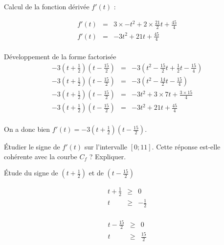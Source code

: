 \begin{questions}
		\begin{solution}
			Calcul de la fonction dérivée $f'(t)$ :
			
			\begin{eqnarray*}
				f'(t) &=& 3 \times -t^2 + 2 \times \frac{21}{2} t + \frac{45}{4} \\
				f'(t) &=& -3t^2 + 21 t + \frac{45}{4} \\
			\end{eqnarray*}
		
			Développement de la forme factorisée
			\begin{eqnarray*}
				-3 \left(t + \frac{1}{2} \right) \left(t - \frac{15}{2} \right) &=& -3 \left( t^2 - \frac{15}{2}t + \frac{1}{2}t - \frac{15}{4}\right) \\
				-3 \left(t + \frac{1}{2} \right) \left(t - \frac{15}{2} \right) &=& -3 \left( t^2 - \frac{14}{2}t - \frac{15}{4}\right) \\
				-3 \left(t + \frac{1}{2} \right) \left(t - \frac{15}{2} \right) &=&  -3t^2 + 3 \times 7t + \frac{3 \times 15}{4}  \\
				-3 \left(t + \frac{1}{2} \right) \left(t - \frac{15}{2} \right) &=& -3t^2 + 21t + \frac{45}{4} \\
			\end{eqnarray*}
			
			On a donc bien $f'(t) = -3 \left(t + \frac{1}{2} \right) \left(t - \frac{15}{2} \right)$.
		\end{solution}
		
	\question[2] \'Etudier le signe de $f'(t)$ sur l'intervalle $\left[0; 11\right]$. Cette réponse est-elle cohérente avec la courbe $C_f$ ? Expliquer.
	
	\begin{solution}
		\'Etude du signe de $(t + \frac{1}{2})$ et de $(t - \frac{15}{2})$
		
		\begin{multicols}{2}
			\begin{eqnarray*}
				t + \frac{1}{2} & \ge & 0 \\
				t & \ge & - \frac{1}{2} \\
			\end{eqnarray*}
		
			\begin{eqnarray*}
				t - \frac{15}{2} & \ge & 0 \\
				t & \ge & \frac{15}{2} \\
			\end{eqnarray*}
		\end{multicols}
	

\end{solution}
\end{questions}
